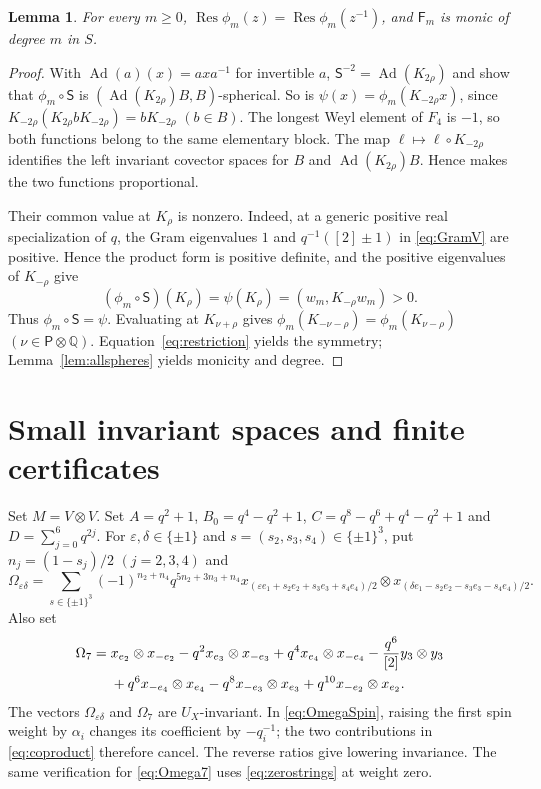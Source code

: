 \documentclass[12pt,reqno]{amsart}
\theoremstyle{plain}
\newtheorem{lemma}[theorem]{Lemma}
\theoremstyle{definition}
\numberwithin{equation}{section}
\newcommand{\Res}{\operatorname{Res}}
\newcommand{\tens}{\otimes}
\begin{document}
\begin{lemma}\label{lem:shiftedsymmetry}
	For every $m\geq0$,
	$\Res\phi_m(z)=\Res\phi_m(z^{-1})$, and $\mathsf{F}_m$ is monic
	of degree $m$ in $S$.
\end{lemma}

\begin{proof}
	With $\operatorname{Ad}(a)(x)=axa^{-1}$ for invertible $a$,
	$\mathsf S^{-2}=\operatorname{Ad}(K_{2\rho})$ and
	\cite[Proposition~4.25]{Mee26} show that $\phi_m\circ\mathsf S$ is
	$(\operatorname{Ad}(K_{2\rho})B,B)$-spherical.
	So is $\psi(x)=\phi_m(K_{-2\rho}x)$, since $K_{-2\rho}(K_{2\rho}bK_{-2\rho})=bK_{-2\rho}$ $(b\in B)$.
	The longest Weyl element of $F_4$ is $-1$, so both functions
	belong to the same elementary block. The map
	$\ell\mapsto\ell\circ K_{-2\rho}$ identifies the left invariant
	covector spaces for $B$ and $\operatorname{Ad}(K_{2\rho})B$.
	Hence \cite[Lemma~4.2]{Mee26} makes the two functions proportional.
	
	Their common value at $K_\rho$ is nonzero.
	Indeed, at a generic positive real specialization of $q$,
	the Gram eigenvalues $1$ and $q^{-1}([2]\pm1)$ in
	\eqref{eq:GramV} are positive. Hence the product form is
	positive definite, and the positive eigenvalues of $K_{-\rho}$ give
	\[
	(\phi_m\circ\mathsf S)(K_\rho)
	=\psi(K_\rho)
	=(w_m,K_{-\rho}w_m)>0.
	\]
	Thus $\phi_m\circ\mathsf S=\psi$. Evaluating at $K_{\nu+\rho}$ gives $\phi_m(K_{-\nu-\rho})=\phi_m(K_{\nu-\rho})$ $(\nu\in\mathsf P\otimes\mathbb Q)$.
	Equation~\eqref{eq:restriction} yields the symmetry;
	Lemma~\ref{lem:allspheres} yields monicity and degree.
\end{proof}


\section{Small invariant spaces and finite certificates}
\label{sec:smallspaces}
Set $M=V\tens V$.
Set $A=q^2+1$, $B_0=q^4-q^2+1$,
$C=q^8-q^6+q^4-q^2+1$ and $D=\sum_{j=0}^6q^{2j}$.
For $\varepsilon,\delta\in\{\pm1\}$ and
$s=(s_2,s_3,s_4)\in\{\pm1\}^3$, put $n_j=(1-s_j)/2$ $(j=2,3,4)$ and
\begin{equation}\label{eq:OmegaSpin}
	\Omega_{\varepsilon\delta}
	=
	\sum_{s\in\{\pm1\}^3}
	(-1)^{n_2+n_4}q^{5n_2+3n_3+n_4}
	x_{(\varepsilon e_1+s_2e_2+s_3e_3+s_4e_4)/2}
	\tens
	x_{(\delta e_1-s_2e_2-s_3e_3-s_4e_4)/2}.
\end{equation}
Also set
\begin{align}\label{eq:Omega7}
	\Omega_7={}&
	x_{e_2}\tens x_{-e_2}
	-q^2x_{e_3}\tens x_{-e_3}
	+q^4x_{e_4}\tens x_{-e_4}
	-\frac{q^6}{[2]}y_3\tens y_3\notag\\
	&+q^6x_{-e_4}\tens x_{e_4}
	-q^8x_{-e_3}\tens x_{e_3}
	+q^{10}x_{-e_2}\tens x_{e_2}.
\end{align}
The vectors $\Omega_{\varepsilon\delta}$ and $\Omega_7$
are $U_X$-invariant.
In \eqref{eq:OmegaSpin}, raising the first spin weight by
$\alpha_i$ changes its coefficient by $-q_i^{-1}$;
the two contributions in \eqref{eq:coproduct} therefore cancel.
The reverse ratios give lowering invariance.
The same verification for \eqref{eq:Omega7} uses
\eqref{eq:zerostrings} at weight zero.
\end{document}
